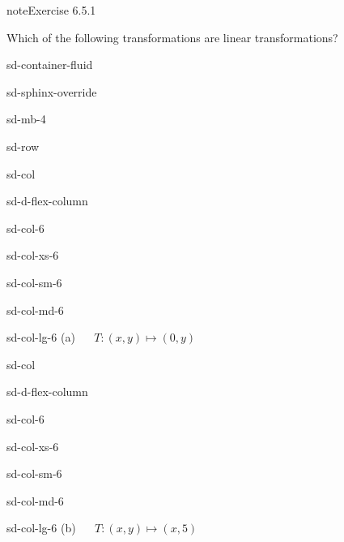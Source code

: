 \documentclass[letterpaper,10pt,english]{jupyterBook}
\begin{document}
\begin{sphinxadmonition}{note}{Exercise 6.5.1}



\sphinxAtStartPar
Which of the following transformations are linear transformations?

\begin{sphinxuseclass}{sd-container-fluid}
\begin{sphinxuseclass}{sd-sphinx-override}
\begin{sphinxuseclass}{sd-mb-4}
\begin{sphinxuseclass}{sd-row}
\begin{sphinxuseclass}{sd-col}
\begin{sphinxuseclass}{sd-d-flex-column}
\begin{sphinxuseclass}{sd-col-6}
\begin{sphinxuseclass}{sd-col-xs-6}
\begin{sphinxuseclass}{sd-col-sm-6}
\begin{sphinxuseclass}{sd-col-md-6}
\begin{sphinxuseclass}{sd-col-lg-6}
\sphinxAtStartPar
(a)   \(T: (x, y) \mapsto (0, y)\)

\end{sphinxuseclass}
\end{sphinxuseclass}
\end{sphinxuseclass}
\end{sphinxuseclass}
\end{sphinxuseclass}
\end{sphinxuseclass}
\end{sphinxuseclass}
\begin{sphinxuseclass}{sd-col}
\begin{sphinxuseclass}{sd-d-flex-column}
\begin{sphinxuseclass}{sd-col-6}
\begin{sphinxuseclass}{sd-col-xs-6}
\begin{sphinxuseclass}{sd-col-sm-6}
\begin{sphinxuseclass}{sd-col-md-6}
\begin{sphinxuseclass}{sd-col-lg-6}
\sphinxAtStartPar
(b)   \(T: (x, y) \mapsto (x, 5)\)


\end{sphinxuseclass}
\end{sphinxuseclass}
\end{sphinxuseclass}
\end{sphinxuseclass}
\end{sphinxuseclass}
\end{sphinxuseclass}
\end{sphinxuseclass}
\end{sphinxuseclass}
\end{sphinxuseclass}
\end{sphinxuseclass}
\end{sphinxuseclass}
\end{sphinxadmonition}
\end{document}
